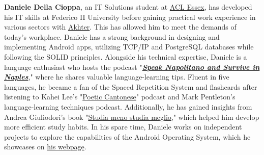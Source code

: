 %
%

\textbf{Daniele Della Cioppa}, an IT Solutions student at \href{https://aclessex.com/about-us/}{ACL Essex}, has developed his IT skills at Federico II University before gaining practical work experience in various sectors with \href{https://www.akhter.co.uk/}{Akhter}. This has allowed him to meet the demands of today's workplace. Daniele has a strong background in designing and implementing Android apps, utilizing TCP/IP and PostgreSQL databases while following the SOLID principles. Alongside his technical expertise, Daniele is a language enthusiast who hosts the podcast "\textbf{\emph{\href{https://open.spotify.com/show/05U0mbJEdy1PtqnXOTFHAR}{Speak Napolitano and Survive in Naples}}}," where he shares valuable language-learning tips. Fluent in five languages, he became a fan of the Spaced Repetition System and flashcards after listening to Kahei Lee's "\href{https://www.poeticcantonese.com/}{Poetic Cantonese}" podcast and Mark Pentleton's language-learning techniques podcast. Additionally, he has gained insights from Andrea Giuliodori's book "\href{https://www.efficacemente.com/}{Studia meno studia meglio}," which helped him develop more efficient study habits. In his spare time, Daniele works on independent projects to explore the capabilities of the Android Operating System, which he showcases on \href{https://danieledellacioppa.github.io/}{his webpage}.

